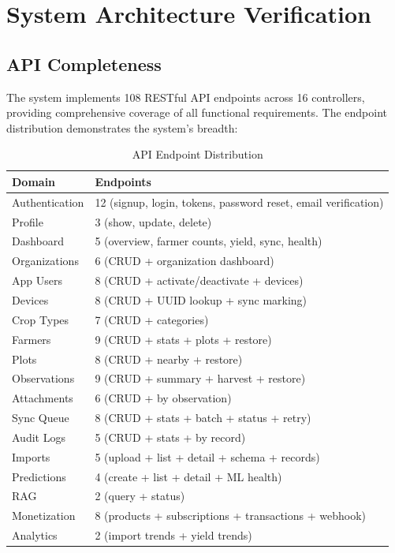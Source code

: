 \section{System Architecture Verification}

\subsection{API Completeness}

The system implements 108 RESTful API endpoints across 16 controllers, providing comprehensive coverage of all functional requirements. The endpoint distribution demonstrates the system's breadth:

\begin{table}[H]
\centering
\caption{API Endpoint Distribution}
\label{tab:api-distribution}
\begin{tabularx}{\textwidth}{lX}
\toprule
\textbf{Domain} & \textbf{Endpoints} \\
\midrule
Authentication & 12 (signup, login, tokens, password reset, email verification) \\
Profile & 3 (show, update, delete) \\
Dashboard & 5 (overview, farmer counts, yield, sync, health) \\
Organizations & 6 (CRUD + organization dashboard) \\
App Users & 8 (CRUD + activate/deactivate + devices) \\
Devices & 8 (CRUD + UUID lookup + sync marking) \\
Crop Types & 7 (CRUD + categories) \\
Farmers & 9 (CRUD + stats + plots + restore) \\
Plots & 8 (CRUD + nearby + restore) \\
Observations & 9 (CRUD + summary + harvest + restore) \\
Attachments & 6 (CRUD + by observation) \\
Sync Queue & 8 (CRUD + stats + batch + status + retry) \\
Audit Logs & 5 (CRUD + stats + by record) \\
Imports & 5 (upload + list + detail + schema + records) \\
Predictions & 4 (create + list + detail + ML health) \\
RAG & 2 (query + status) \\
Monetization & 8 (products + subscriptions + transactions + webhook) \\
Analytics & 2 (import trends + yield trends) \\
\bottomrule
\end{tabularx}
\end{table}

